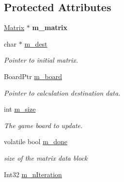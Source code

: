 \subsection*{Protected Attributes}
\begin{DoxyCompactItemize}
\item 
\hypertarget{classabstract_afd156626a2264fdb5a8ef0080444bc7c}{}\hyperlink{classMatrix}{Matrix} $\ast$ {\bfseries m\+\_\+matrix}\label{classabstract_afd156626a2264fdb5a8ef0080444bc7c}

\item 
\hypertarget{classabstract_ad69f834dcf8ee5825bd14215f85642f1}{}char $\ast$ \hyperlink{classabstract_ad69f834dcf8ee5825bd14215f85642f1}{m\+\_\+dest}\label{classabstract_ad69f834dcf8ee5825bd14215f85642f1}

\begin{DoxyCompactList}\small\item\em Pointer to initial matrix. \end{DoxyCompactList}\item 
\hypertarget{classabstract_ae5372638ee6221954150aac4284abe6a}{}Board\+Ptr \hyperlink{classabstract_ae5372638ee6221954150aac4284abe6a}{m\+\_\+board}\label{classabstract_ae5372638ee6221954150aac4284abe6a}

\begin{DoxyCompactList}\small\item\em Pointer to calculation destination data. \end{DoxyCompactList}\item 
\hypertarget{classabstract_ab5503f99091b55b49196f0676cda7d91}{}int \hyperlink{classabstract_ab5503f99091b55b49196f0676cda7d91}{m\+\_\+size}\label{classabstract_ab5503f99091b55b49196f0676cda7d91}

\begin{DoxyCompactList}\small\item\em The game board to update. \end{DoxyCompactList}\item 
\hypertarget{classabstract_a603c9183f72c7eac955dde6ca08a2d36}{}volatile bool \hyperlink{classabstract_a603c9183f72c7eac955dde6ca08a2d36}{m\+\_\+done}\label{classabstract_a603c9183f72c7eac955dde6ca08a2d36}

\begin{DoxyCompactList}\small\item\em size of the matrix data block \end{DoxyCompactList}\item 
\hypertarget{classabstract_a63a0cbaa40101932a4bcbfb6be42a670}{}Int32 \hyperlink{classabstract_a63a0cbaa40101932a4bcbfb6be42a670}{m\+\_\+n\+Iteration}\label{classabstract_a63a0cbaa40101932a4bcbfb6be42a670}


\end{DoxyCompactItemize}
